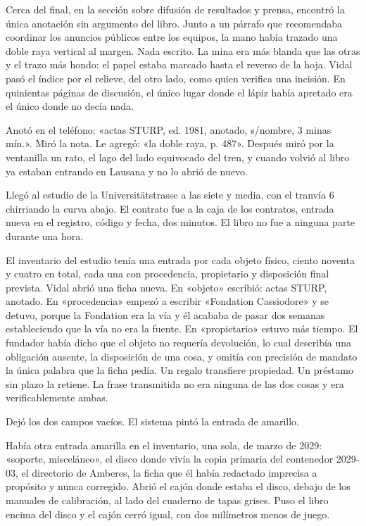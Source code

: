 Cerca del final, en la sección sobre difusión de resultados y prensa, encontró la única anotación sin argumento del libro. Junto a un párrafo que recomendaba coordinar los anuncios públicos entre los equipos, la mano había trazado una doble raya vertical al margen. Nada escrito. La mina era más blanda que las otras y el trazo más hondo: el papel estaba marcado hasta el reverso de la hoja. Vidal pasó el índice por el relieve, del otro lado, como quien verifica una incisión. En quinientas páginas de discusión, el único lugar donde el lápiz había apretado era el único donde no decía nada.

Anotó en el teléfono: «actas STURP, ed. 1981, anotado, s/nombre, 3 minas mín.». Miró la nota. Le agregó: «la doble raya, p. 487». Después miró por la ventanilla un rato, el lago del lado equivocado del tren, y cuando volvió al libro ya estaban entrando en Lausana y no lo abrió de nuevo.


\scenebreak


Llegó al estudio de la Universitätstrasse a las siete y media, con el tranvía 6 chirriando la curva abajo. El contrato fue a la caja de los contratos, entrada nueva en el registro, código y fecha, dos minutos. El libro no fue a ninguna parte durante una hora.

El inventario del estudio tenía una entrada por cada objeto físico, ciento noventa y cuatro en total, cada una con procedencia, propietario y disposición final prevista. Vidal abrió una ficha nueva. En «objeto» escribió: actas STURP, anotado. En «procedencia» empezó a escribir «Fondation Cassiodore» y se detuvo, porque la Fondation era la vía y él acababa de pasar dos semanas estableciendo que la vía no era la fuente. En «propietario» estuvo más tiempo. El fundador había dicho que el objeto no requería devolución, lo cual describía una obligación ausente, la disposición de una cosa, y omitía con precisión de mandato la única palabra que la ficha pedía. Un regalo transfiere propiedad. Un préstamo sin plazo la retiene. La frase transmitida no era ninguna de las dos cosas y era verificablemente ambas.

Dejó los dos campos vacíos. El sistema pintó la entrada de amarillo.

Había otra entrada amarilla en el inventario, una sola, de marzo de 2029: «soporte, misceláneo», el disco donde vivía la copia primaria del contenedor 2029-03, el directorio de Amberes, la ficha que él había redactado imprecisa a propósito y nunca corregido. Abrió el cajón donde estaba el disco, debajo de los manuales de calibración, al lado del cuaderno de tapas grises. Puso el libro encima del disco y el cajón cerró igual, con dos milímetros menos de juego.

